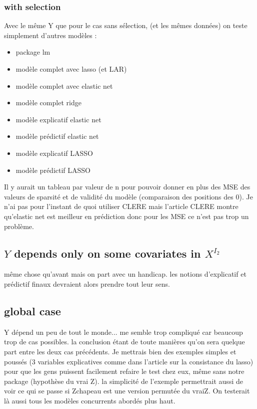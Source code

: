 \documentclass[11pt,a4paper]{article}
\begin{document}
		\subsubsection{with selection}
			Avec le même Y que pour le cas sans sélection, (et les mêmes données) on teste simplement d'autres modèles :
			\begin{itemize}
			\item package lm
			\item modèle complet avec lasso (et LAR)
			\item modèle complet avec elastic net
			\item modèle complet ridge
			\item modèle explicatif elastic net
			\item modèle prédictif elastic net
			\item modèle explicatif LASSO
			\item modèle prédictif LASSO
\end{itemize}					
	
	Il y aurait un tableau par valeur de n pour pouvoir donner en plus des MSE des valeurs de sparsité et de validité du modèle (comparaison des positions des 0).
	Je n'ai pas pour l'instant de quoi utiliser CLERE mais l'article CLERE montre qu'elastic net est meilleur en prédiction donc pour les MSE ce n'est pas trop un problème.
	\subsection{$Y$ depends only on some covariates in $X^{I_2}$}
		même chose qu'avant mais on part avec un handicap. les notions d'explicatif et prédictif finaux devraient alors prendre tout leur sens.
		
	\subsection{global case}		
		Y dépend un peu de tout le monde... me semble trop compliqué car beaucoup trop de cas possibles. la conclusion étant de toute manières qu'on sera quelque part entre les deux cas précédents.			Je mettrais bien des exemples simples et poussés (3 variables explicatives comme dans l'article sur la consistance du lasso) pour que les gens puissent facilement refaire le test chez eux, même sans notre package (hypothèse du vrai Z).
		la simplicité de l'exemple permettrait aussi de voir ce qui se passe si Zchapeau est une version permutée du vraiZ. 
		On testerait là aussi tous les modèles concurrents abordés plus haut.
		
\end{document}
